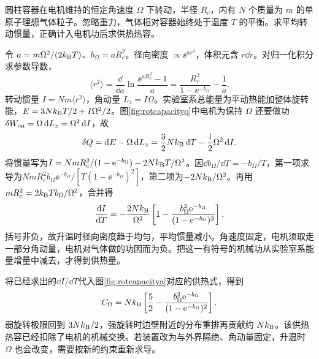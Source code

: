 \begin{example}[恒定角速度下的旋转气体热容]
圆柱容器在电机维持的恒定角速度 $\Omega$ 下转动，半径 $R_c$，内有 $N$ 个质量为 $m$ 的单原子理想气体粒子。忽略重力，气体相对容器始终处于温度 $T$ 的平衡。求平均转动惯量，正确计入电机功后求供热热容。
\end{example}
\begin{solution}
令 $a=m\Omega^2/(2k_{\mathrm B} T)$、$b_\Omega=aR_c^2$。径向密度 $\propto\ee^{ar^2}$，体积元含 $r\dd r$。对归一化积分求参数导数，
\[
 \langle r^2\rangle=\frac{\dd}{\dd a}\ln\frac{\ee^{aR_c^2}-1}{a}
 =\frac{R_c^2}{1-\ee^{-b_\Omega}}-\frac1a.
\]
转动惯量 $I=Nm\langle r^2\rangle$，角动量 $L_z=I\Omega$。实验室系总能量为平动热能加整体旋转能，$E=3Nk_{\mathrm B} T/2+I\Omega^2/2$。图\ref{fig:rotcapacityq}中电机为保持 $\Omega$ 还要做功 $\delta W_{\rm on}=\Omega\mathop{}\!\mathrm d L_z=\Omega^2\mathop{}\!\mathrm d I$，故
\[
 \delta Q=\mathop{}\!\mathrm d E-\Omega\mathop{}\!\mathrm d L_z
 =\frac32Nk_{\mathrm B}\mathop{}\!\mathrm d T-\frac12\Omega^2\mathop{}\!\mathrm d I.
\]
将惯量写为$I=NmR_c^2/(1-\mathrm e^{-b_\Omega})-2Nk_{\mathrm B} T/\Omega^2$。因$\dd b_\Omega/\dd T=-b_\Omega/T$，第一项求导为$NmR_c^2b_\Omega\ee^{-b_\Omega}/[T(1-\ee^{-b_\Omega})^2]$，第二项为$-2Nk_{\mathrm B}/\Omega^2$。再用$mR_c^2=2k_{\mathrm B} Tb_\Omega/\Omega^2$，合并得
\[
 \frac{\mathop{}\!\mathrm d I}{\mathop{}\!\mathrm d T}=-\frac{2Nk_{\mathrm B}}{\Omega^2}
 \left[1-\frac{b_\Omega^2\mathrm e^{-b_\Omega}}
 {(1-\mathrm e^{-b_\Omega})^2}\right].
\]
括号非负，故升温时径向密度趋于均匀，平均惯量减小。角速度固定，电机须取走一部分角动量，电机对气体做的功因而为负。把这一有符号的机械功从实验室系能量增量中减去，才得到供热量。

将已经求出的$\dd I/\dd T$代入图\ref{fig:rotcapacitya}对应的供热式，得到
\[
 C_\Omega=Nk_{\mathrm B}\left[\frac52-
 \frac{b_\Omega^2\mathrm e^{-b_\Omega}}{(1-\mathrm e^{-b_\Omega})^2}\right].
\]
弱旋转极限回到 $3Nk_{\mathrm B}/2$，强旋转时边壁附近的分布重排再贡献约 $Nk_{\mathrm B}$。该供热热容已经扣除了电机的机械交换。若装置改为与外界隔绝、角动量固定，升温时 $\Omega$ 也会改变，需要按新的约束重新求导。
\end{solution}

